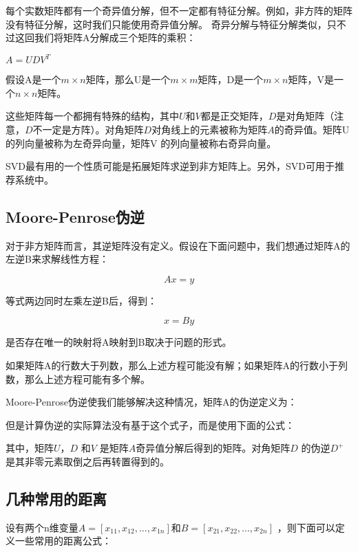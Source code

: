 \documentclass[11pt]{book}
\newcounter{#2}
\newcounter{#2}[#1]
\numberwithin{#2}{#1}
\begin{document}
每个实数矩阵都有一个奇异值分解，但不一定都有特征分解。例如，非方阵的矩阵没有特征分解，这时我们只能使用奇异值分解。
奇异分解与特征分解类似，只不过这回我们将矩阵A分解成三个矩阵的乘积：

\begin{center}
	$ A=UDV^{T} $ 
\end{center}
假设A是一个$ m\times n $矩阵，那么U是一个$ m\times m $矩阵，D是一个$ m\times n $矩阵，V是一个$ n\times n $矩阵。

这些矩阵每一个都拥有特殊的结构，其中$ U $和$ V $都是正交矩阵，$ D $是对角矩阵（注意，$ D $不一定是方阵）。对角矩阵$ D $对角线上的元素被称为矩阵$ A $的奇异值。矩阵U的列向量被称为左奇异向量，矩阵V 的列向量被称右奇异向量。

SVD最有用的一个性质可能是拓展矩阵求逆到非方矩阵上。另外，SVD可用于推荐系统中。
\subsection{Moore-Penrose伪逆}

对于非方矩阵而言，其逆矩阵没有定义。假设在下面问题中，我们想通过矩阵A的左逆B来求解线性方程：

\begin{center}\begin{equation} Ax=y \end{equation}\end{center}
等式两边同时左乘左逆B后，得到：

\begin{center}\begin{equation}x=By\end{equation}\end{center}
是否存在唯一的映射将A映射到B取决于问题的形式。

如果矩阵A的行数大于列数，那么上述方程可能没有解；如果矩阵A的行数小于列数，那么上述方程可能有多个解。

Moore-Penrose伪逆使我们能够解决这种情况，矩阵A的伪逆定义为：

但是计算伪逆的实际算法没有基于这个式子，而是使用下面的公式：

其中，矩阵$ U $，$ D $ 和$ V $ 是矩阵$ A $奇异值分解后得到的矩阵。对角矩阵$ D $ 的伪逆$ D^{+} $ 是其非零元素取倒之后再转置得到的。

\subsection{几种常用的距离}

设有两个n维变量$ A=\left[ x_{11}, x_{12},...,x_{1n}   \right] $和$ B=\left[ x_{21} ,x_{22} ,...,x_{2n}  \right] $ ，则下面可以定义一些常用的距离公式：
\end{document}
